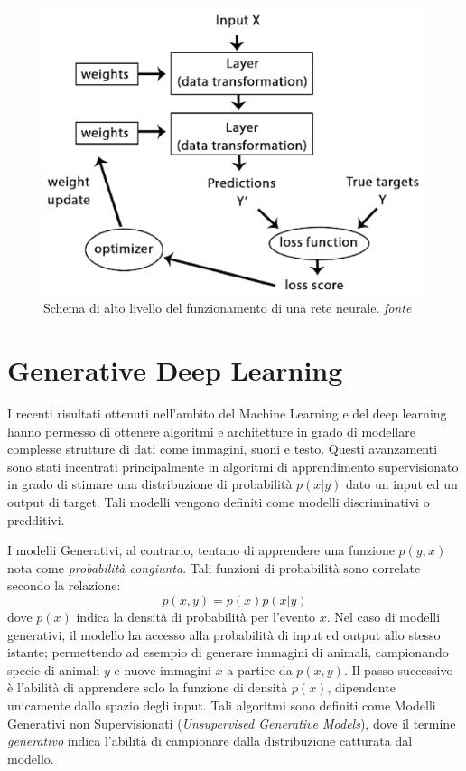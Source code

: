 \begin{figure}[!bp]
	\centering
	\includegraphics[width=0.8\columnwidth]{figures/deeploss.png}
	\caption{Schema di alto livello del funzionamento di una rete neurale. \textit{fonte}%
	~\cite{chollet2017deep} \label{fig:neuralloss} }
\end{figure}

\newpage
\section{Generative Deep Learning}
\label{sec:gan}
I recenti risultati ottenuti nell'ambito del Machine Learning e del deep learning hanno permesso di ottenere algoritmi e architetture in grado di modellare complesse strutture di dati come immagini, suoni e testo. Questi avanzamenti sono stati incentrati principalmente in algoritmi di apprendimento supervisionato in grado di stimare una distribuzione di probabilità $p(x|y)$ dato un input ed un output di target. Tali modelli vengono definiti come modelli discriminativi o predditivi.

I modelli Generativi, al contrario, tentano di apprendere una funzione $p(y,x)$ nota come \textit{probabilità congiunta}. Tali funzioni di probabilità sono correlate secondo la relazione: 
\[p(x,y)=p(x)p(x|y)\]
dove $p(x)$ indica la densità di probabilità per l'evento $x$. 
Nel caso di modelli generativi, il modello ha accesso alla probabilità di input ed output allo stesso istante; permettendo ad esempio di generare immagini di animali, campionando specie di animali $y$ e nuove immagini $x$ a partire da $p(x,y)$.
Il passo successivo è l'abilità di apprendere solo la funzione di densità $p(x)$, dipendente unicamente dallo spazio degli input. Tali algoritmi sono definiti come Modelli Generativi non Supervisionati (\textit{Unsupervised Generative Models}), dove il termine \textit{generativo} indica l'abilità di campionare dalla distribuzione catturata dal modello. 

